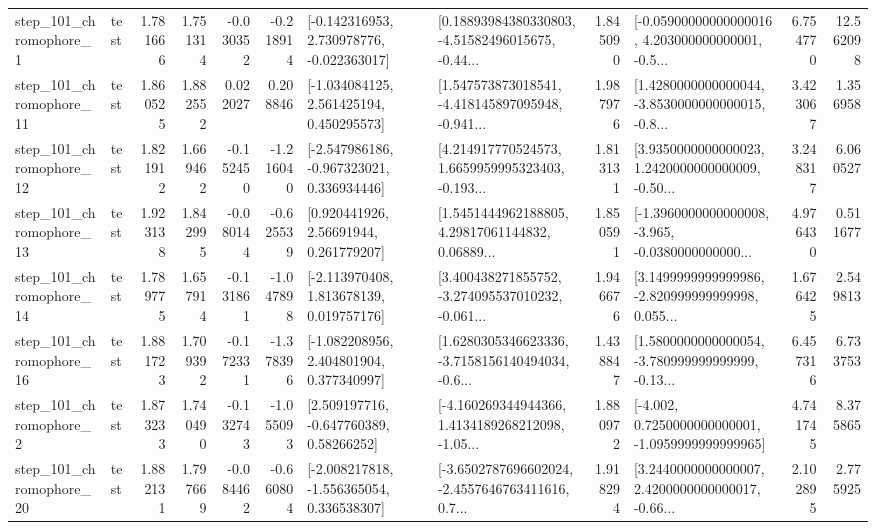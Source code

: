 \begin{tabular}{llrrrrllrlrr}
   step\_101\_chromophore\_1 &      test &      1.781666 &    1.751314 &     -0.030352 & -0.218914 &   [-0.142316953, 2.730978776, -0.022363017] &  [0.18893984380330803, -4.51582496015675, -0.44... &       1.845090 &  [-0.05900000000000016, 4.203000000000001, -0.5... &            6.754770 &         12.562098 \\
  step\_101\_chromophore\_11 &      test &      1.860525 &    1.882552 &      0.022027 &  0.208846 &    [-1.034084125, 2.561425194, 0.450295573] &  [1.547573873018541, -4.418145897095948, -0.941... &       1.987976 &  [1.4280000000000044, -3.8530000000000015, -0.8... &            3.423067 &          1.356958 \\
  step\_101\_chromophore\_12 &      test &      1.821912 &    1.669462 &     -0.152450 & -1.216040 &   [-2.547986186, -0.967323021, 0.336934446] &  [4.214917770524573, 1.6659959995323403, -0.193... &       1.813131 &  [3.9350000000000023, 1.2420000000000009, -0.50... &            3.248317 &          6.060527 \\
  step\_101\_chromophore\_13 &      test &      1.923138 &    1.842995 &     -0.080144 & -0.625539 &      [0.920441926, 2.56691944, 0.261779207] &  [1.5451444962188805, 4.29817061144832, 0.06889... &       1.850591 &  [-1.3960000000000008, -3.965, -0.0380000000000... &            4.976430 &          0.511677 \\
  step\_101\_chromophore\_14 &      test &      1.789775 &    1.657914 &     -0.131861 & -1.047898 &    [-2.113970408, 1.813678139, 0.019757176] &  [3.400438271855752, -3.274095537010232, -0.061... &       1.946676 &  [3.1499999999999986, -2.820999999999998, 0.055... &            1.676425 &          2.549813 \\
  step\_101\_chromophore\_16 &      test &      1.881723 &    1.709392 &     -0.172331 & -1.378396 &    [-1.082208956, 2.404801904, 0.377340997] &  [1.6280305346623336, -3.7158156140494034, -0.6... &       1.438847 &  [1.5800000000000054, -3.780999999999999, -0.13... &            6.457316 &          6.733753 \\
   step\_101\_chromophore\_2 &      test &      1.873233 &    1.740490 &     -0.132743 & -1.055093 &     [2.509197716, -0.647760389, 0.58266252] &  [-4.160269344944366, 1.4134189268212098, -1.05... &       1.880972 &  [-4.002, 0.7250000000000001, -1.0959999999999965] &            4.741745 &          8.375865 \\
  step\_101\_chromophore\_20 &      test &      1.882131 &    1.797669 &     -0.084462 & -0.660804 &   [-2.008217818, -1.556365054, 0.336538307] &  [-3.6502787696602024, -2.4557646763411616, 0.7... &       1.918294 &  [3.2440000000000007, 2.4200000000000017, -0.66... &            2.102895 &          2.775925 \\

\end{tabular}
